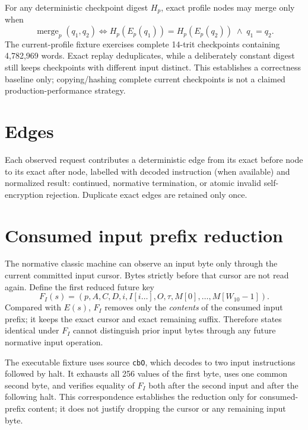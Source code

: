 \documentclass{article}
\begin{document}
For any deterministic checkpoint digest $H_p$, exact profile nodes may merge only
when
\begin{equation}
  \operatorname{merge}_p(q_1,q_2)
    \Longleftrightarrow
    H_p(E_p(q_1))=H_p(E_p(q_2))\;\land\;q_1=q_2.
  \label{eq:state-graph-profile-collision-safe-merge}
\end{equation}
The current-profile fixture exercises complete 14-trit checkpoints containing
4,782,969 words. Exact replay deduplicates, while a deliberately constant digest
still keeps checkpoints with different input distinct. This establishes a
correctness baseline only; copying/hashing complete current checkpoints is not a
claimed production-performance strategy.

\section{Edges}

Each observed request contributes a deterministic edge from its exact before
node to its exact after node, labelled with decoded instruction (when available)
and normalized result: continued, normative termination, or atomic invalid
self-encryption rejection. Duplicate exact edges are retained only once.

\section{Consumed input prefix reduction}

The normative classic machine can observe an input byte only through the current
committed input cursor. Bytes strictly before that cursor are not read again.
Define the first reduced future key
\begin{equation}
  F_I(s)=\left(
    p,A,C,D,i,I[i\ldots],O,\tau,M[0],\ldots,M[W_{10}-1]
  \right).
  \label{eq:state-graph-consumed-input-prefix}
\end{equation}
Compared with $E(s)$, $F_I$ removes only the \emph{contents} of the consumed
input prefix; it keeps the exact cursor and exact remaining suffix. Therefore
states identical under $F_I$ cannot distinguish prior input bytes through any
future normative input operation.

The executable fixture uses source \texttt{cbO}, which decodes to two input
instructions followed by halt. It exhausts all 256 values of the first byte,
uses one common second byte, and verifies equality of $F_I$ both after the second
input and after the following halt. This correspondence establishes the
reduction only for consumed-prefix content; it does not justify dropping the
cursor or any remaining input byte.
\end{document}
